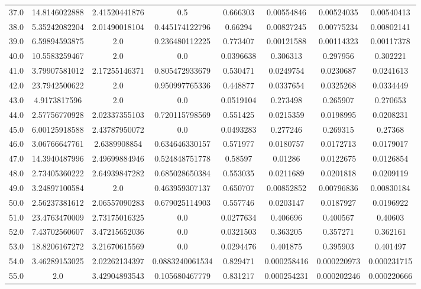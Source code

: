 \begin{longtable}{|c|c|c|c|c|c|c|c|}
37.0 & 14.8146022888 & 2.41520441876 & 0.5 & 0.666303 & 0.00554846 & 0.00524035 & 0.00540413 \\
38.0 & 5.35242082204 & 2.01490018104 & 0.445174122796 & 0.66294 & 0.00827245 & 0.00775234 & 0.00802141 \\
39.0 & 6.59894593875 & 2.0 & 0.236480112225 & 0.773407 & 0.00121588 & 0.00114323 & 0.00117378 \\
40.0 & 10.5583259467 & 2.0 & 0.0 & 0.0396638 & 0.306313 & 0.297956 & 0.302221 \\
41.0 & 3.79907581012 & 2.17255146371 & 0.805472933679 & 0.530471 & 0.0249754 & 0.0230687 & 0.0241613 \\
42.0 & 23.7942500622 & 2.0 & 0.950997765336 & 0.448877 & 0.0337654 & 0.0325268 & 0.0334449 \\
43.0 & 4.9173817596 & 2.0 & 0.0 & 0.0519104 & 0.273498 & 0.265907 & 0.270653 \\
44.0 & 2.57756770928 & 2.02337355103 & 0.720115798569 & 0.551425 & 0.0215359 & 0.0198995 & 0.0208231 \\
45.0 & 6.00125918588 & 2.43787950072 & 0.0 & 0.0493283 & 0.277246 & 0.269315 & 0.27368 \\
46.0 & 3.06766647761 & 2.6389908854 & 0.634646330157 & 0.571977 & 0.0180757 & 0.0172713 & 0.0179017 \\
47.0 & 14.3940487996 & 2.49699884946 & 0.524848751778 & 0.58597 & 0.01286 & 0.0122675 & 0.0126854 \\
48.0 & 2.73405360222 & 2.64939847282 & 0.685028650384 & 0.553035 & 0.0211689 & 0.0201818 & 0.0209119 \\
49.0 & 3.24897100584 & 2.0 & 0.463959307137 & 0.650707 & 0.00852852 & 0.00796836 & 0.00830184 \\
50.0 & 2.56237381612 & 2.06557090283 & 0.679025114903 & 0.557746 & 0.0203147 & 0.0187927 & 0.0196922 \\
51.0 & 23.4763470009 & 2.73175016325 & 0.0 & 0.0277634 & 0.406696 & 0.400567 & 0.40603 \\
52.0 & 7.43702560607 & 3.47215652036 & 0.0 & 0.0321503 & 0.363205 & 0.357271 & 0.362161 \\
53.0 & 18.8206167272 & 3.21670615569 & 0.0 & 0.0294476 & 0.401875 & 0.395903 & 0.401497 \\
54.0 & 3.46289153025 & 2.02262134397 & 0.0883240061534 & 0.829471 & 0.000258416 & 0.000220973 & 0.000231715 \\
55.0 & 2.0 & 3.42904893543 & 0.105680467779 & 0.831217 & 0.000254231 & 0.000202246 & 0.000220666 \\

\end{longtable}
